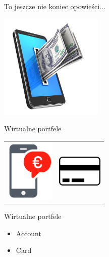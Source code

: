 \documentclass{beamer}
\begin{document}
\begin{frame}{}
	\begin{center}
		\Huge{To jeszcze nie koniec opowieści...}
	\end{center}
\end{frame}

\begin{frame}{}
	\begin{center}
		\includegraphics[height=5cm]{wallet1.jpg}
	\end{center}
\end{frame}

\begin{frame}{Wirtualne portfele}
	\begin{center}
		\begin{tabular}{ c c }
  			\includegraphics[height=3cm]{wallet2.png} & \includegraphics[height=1.5cm]{prepaid1.png}
		\end{tabular}
	\end{center}
\end{frame}

\begin{frame}{Wirtualne portfele}
	\begin{huge}
		\begin{itemize}[<+->]
			\item Account
			\item Card
		\end{itemize}
	\end{huge}
\end{frame}
\end{document}
